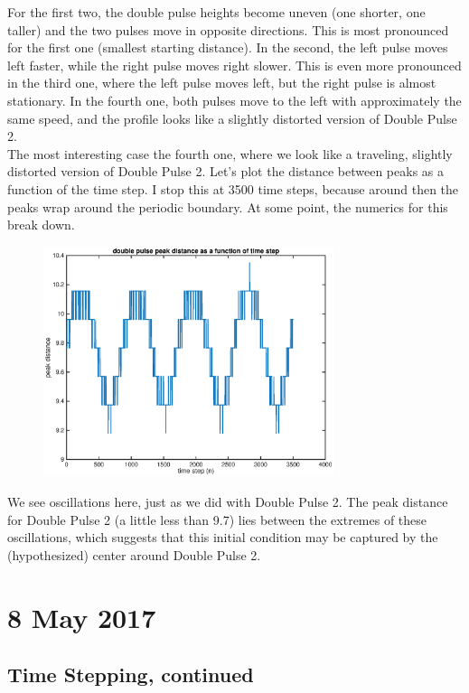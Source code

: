 \documentclass[12pt]{article}
\begin{document}
For the first two, the double pulse heights become uneven (one shorter, one taller) and the two pulses move in opposite directions. This is most pronounced for the first one (smallest starting distance). In the second, the left pulse moves left faster, while the right pulse moves right slower. This is even more pronounced in the third one, where the left pulse moves left, but the right pulse is almost stationary. In the fourth one, both pulses move to the left with approximately the same speed, and the profile looks like a slightly distorted version of Double Pulse 2.\\

The most interesting case the fourth one, where we look like a traveling, slightly distorted version of Double Pulse 2. Let's plot the distance between peaks as a function of the time step. I stop this at 3500 time steps, because around then the peaks wrap around the periodic boundary. At some point, the numerics for this break down.

\begin{figure}[H]
	\includegraphics[width=8.5cm]{2double1_osc1.eps}
\end{figure}
We see oscillations here, just as we did with Double Pulse 2. The peak distance for Double Pulse 2 (a little less than 9.7) lies between the extremes of these oscillations, which suggests that this initial condition may be captured by the (hypothesized) center around Double Pulse 2.

\section*{8 May 2017}

\subsection*{Time Stepping, continued}
\end{document}
